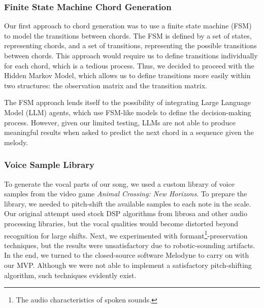 \subsubsection{Finite State Machine Chord Generation}

Our first approach to chord generation was to use a finite state machine (FSM) to model the transitions between chords. The FSM is defined by a set of states, representing chords, and a set of transitions, representing the possible transitions between chords. This approach would require us to define transitions individually for each chord, which is a tedious process. Thus, we decided to proceed with the Hidden Markov Model, which allows us to define transitions more easily within two structures: the observation matrix and the transition matrix.

The FSM approach lends itself to the possibility of integrating Large Language Model (LLM) agents, which use FSM-like models to define the decision-making process. However, given our limited testing, LLMs are not able to produce meaningful results when asked to predict the next chord in a sequence given the melody.

\subsubsection{Voice Sample Library}

To generate the vocal parts of our song, we used a custom library of voice samples from the video game \emph{Animal Crossing: New Horizons}. To prepare the library, we needed to pitch-shift the available samples to each note in the scale. Our original attempt used stock DSP algorithms from librosa and other audio processing libraries, but the vocal qualities would become distorted beyond recognition for large shifts. Next, we experimented with formant\footnote{The audio characteristics of spoken sounds.}-preservation techniques, but the results were unsatisfactory due to robotic-sounding artifacts. In the end, we turned to the closed-source software Melodyne to carry on with our MVP. Although we were not able to implement a satisfactory pitch-shifting algorithm, such techniques evidently exist.
